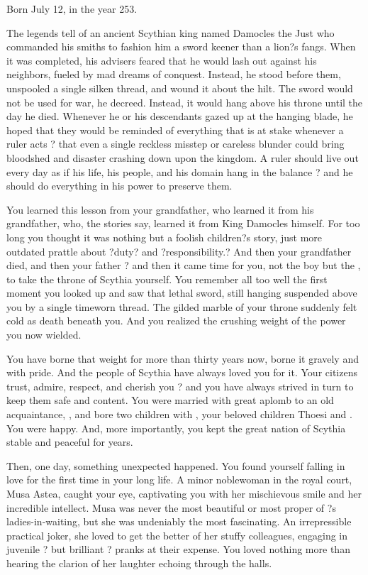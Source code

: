 \documentclass[char]{Kos}
\begin{document}
\name{\cScythiaKing{}}

Born July 12, in the year 253.

The legends tell of an ancient Scythian king named Damocles the Just who commanded his smiths to fashion him a sword keener than a lion?s fangs. When it was completed, his advisers feared that he would lash out against his neighbors, fueled by mad dreams of conquest. Instead, he stood before them, unspooled a single silken thread, and wound it about the hilt. The sword would not be used for war, he decreed. Instead, it would hang above his throne until the day he died. Whenever he or his descendants gazed up at the hanging blade, he hoped that they would be reminded of everything that is at stake whenever a ruler acts ? that even a single reckless misstep or careless blunder could bring bloodshed and disaster crashing down upon the kingdom. A ruler should live out every day as if his life, his people, and his domain hang in the balance ? and he should do everything in his power to preserve them.

    You learned this lesson from your grandfather, who learned it from his grandfather, who, the stories say, learned it from King Damocles himself. For too long you thought it was nothing but a foolish children?s story, just more outdated prattle about ?duty? and ?responsibility.? And then your grandfather died, and then your father ? and then it came time for you, not \cScythiaKing{} the boy but \cScythiaKing{} the \cScythiaKing{\monarch}, to take the throne of Scythia yourself. You remember all too well the first moment you looked up and saw that lethal sword, still hanging suspended above you by a single timeworn thread. The gilded marble of your throne suddenly felt cold as death beneath you. And you realized the crushing weight of the power you now wielded.

    You have borne that weight for more than thirty years now, borne it gravely and with pride. And the people of Scythia have always loved you for it. Your citizens trust, admire, respect, and cherish you ? and you have always strived in turn to keep them safe and content. You were married with great aplomb to an old acquaintance, \cScythiaQueen{}, and bore two children with \cScythiaQueen{\them}, your beloved children Thoesi and \cBride{}. You were happy. And, more importantly, you kept the great nation of Scythia stable and peaceful for years.

    Then, one day, something unexpected happened. You found yourself falling in love for the first time in your long life. A minor noblewoman in the royal court, Musa Astea, caught your eye, captivating you with her mischievous smile and her incredible intellect. Musa was never the most beautiful or most proper of \cScythiaQueen{}?s ladies-in-waiting, but she was undeniably the most fascinating. An irrepressible practical joker, she loved to get the better of her stuffy colleagues, engaging in juvenile ? but brilliant ? pranks at their expense. You loved nothing more than hearing the clarion of her laughter echoing through the halls.
\end{document}
